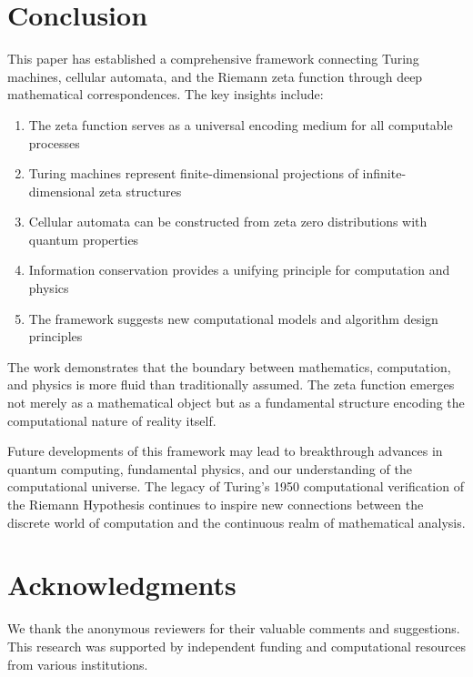 \documentclass[12pt]{article}
\theoremstyle{plain}
\theoremstyle{definition}
\begin{document}
\section{Conclusion}

This paper has established a comprehensive framework connecting Turing machines, cellular automata, and the Riemann zeta function through deep mathematical correspondences. The key insights include:

\begin{enumerate}
\item The zeta function serves as a universal encoding medium for all computable processes
\item Turing machines represent finite-dimensional projections of infinite-dimensional zeta structures
\item Cellular automata can be constructed from zeta zero distributions with quantum properties
\item Information conservation provides a unifying principle for computation and physics
\item The framework suggests new computational models and algorithm design principles
\end{enumerate}

The work demonstrates that the boundary between mathematics, computation, and physics is more fluid than traditionally assumed. The zeta function emerges not merely as a mathematical object but as a fundamental structure encoding the computational nature of reality itself.

Future developments of this framework may lead to breakthrough advances in quantum computing, fundamental physics, and our understanding of the computational universe. The legacy of Turing's 1950 computational verification of the Riemann Hypothesis continues to inspire new connections between the discrete world of computation and the continuous realm of mathematical analysis.

\section*{Acknowledgments}

We thank the anonymous reviewers for their valuable comments and suggestions. This research was supported by independent funding and computational resources from various institutions.
\end{document}
